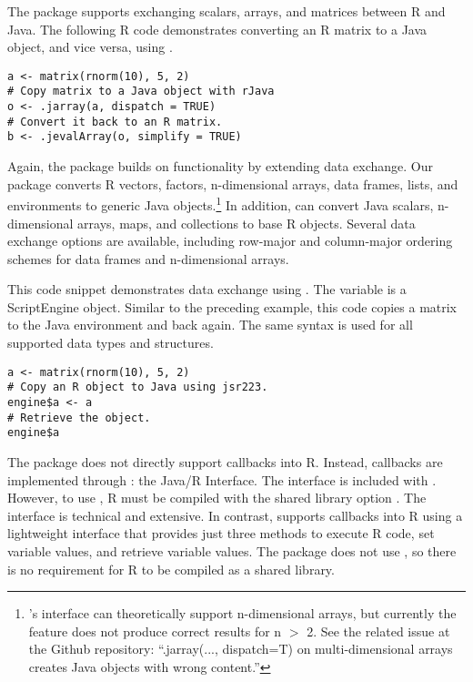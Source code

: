 The  package supports exchanging scalars, arrays, and matrices between R and Java. The following R code demonstrates converting an R matrix to a Java object, and vice versa, using .

\begin{verbatim}
a <- matrix(rnorm(10), 5, 2)
# Copy matrix to a Java object with rJava
o <- .jarray(a, dispatch = TRUE)
# Convert it back to an R matrix.
b <- .jevalArray(o, simplify = TRUE)
\end{verbatim}

Again, the  package builds on  functionality by extending data exchange. Our package converts R vectors, factors, n-dimensional arrays, data frames, lists, and environments to generic Java objects.\footnote{'s interface can theoretically support n-dimensional arrays, but currently the feature does not produce correct results for n $>$ 2. See the related issue at the  Github repository: ``.jarray(..., dispatch=T) on multi-dimensional arrays creates Java objects with wrong content.''} In addition,  can convert Java scalars, n-dimensional arrays, maps, and collections to base R objects. Several data exchange options are available, including row-major and column-major ordering schemes for data frames and n-dimensional arrays.

This code snippet demonstrates data exchange using . The variable  is a  ScriptEngine object. Similar to the preceding  example, this code copies a matrix to the Java environment and back again. The same syntax is used for all supported data types and structures.

\begin{verbatim}
a <- matrix(rnorm(10), 5, 2)
# Copy an R object to Java using jsr223.
engine$a <- a
# Retrieve the object.
engine$a
\end{verbatim}

The  package does not directly support callbacks into R. Instead, callbacks are implemented through : the Java/R Interface. The  interface is included with . However, to use , R must be compiled with the shared library option . The  interface is technical and extensive. In contrast,  supports callbacks into R using a lightweight interface that provides just three methods to execute R code, set variable values, and retrieve variable values. The  package does not use , so there is no requirement for R to be compiled as a shared library.

